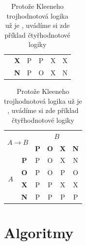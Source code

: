 \documentclass[a4paper, 11pt]{article}
\begin{document}
\begin{table}[h]
\begin{tabular}{|c|c|c|c|c|c|}
		                                                  & \textbf{X}               & P          & P          & X          & X \\ \cline{2-6}
		                                                  & \textbf{N}               & P          & O          & X          & N \\ \hline
	\end{tabular}
	\begin{tabular}{|c|c|c|c|c|c|}
		\hline
		\multicolumn{2}{|c|}{\multirow{2}{*}{$A \rightarrow B$}} & \multicolumn{4}{c|}{$B$}                                            \\ \cline{3-6}
		\multicolumn{2}{|c|}{}                                   & \textbf{P}               & \textbf{O} & \textbf{X} & \textbf{N}     \\ \hline
		\multirow{4}{*}{$A$}                                     & \textbf{P}               & P          & O          & X          & N \\ \cline{2-6}
		                                                         & \textbf{O}               & P          & O          & P          & O \\ \cline{2-6}
		                                                         & \textbf{X}               & P          & P          & X          & X \\ \cline{2-6}
		                                                         & \textbf{N}               & P          & P          & P          & P \\ \hline
	\end{tabular}
	\caption{
		Protože Kleeneho trojhodnotová logika už je , uvádíme si zde
		příklad čtyřhodnotové logiky
	}
	\label{table:logika}
\end{table}
\bigskip

\pagebreak

\section{Algoritmy}
\label{section:algoritmy}
\end{document}
